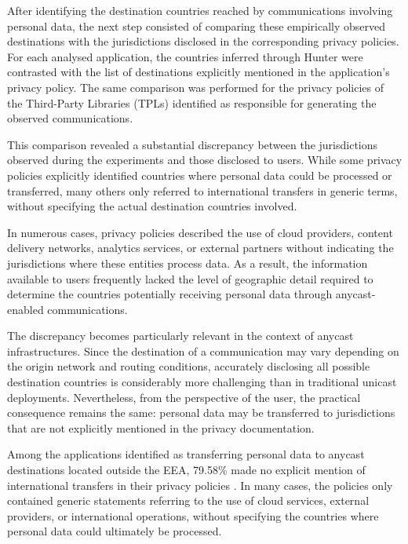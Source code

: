 After identifying the destination countries reached by communications involving personal data, the next step consisted of comparing these empirically observed destinations with the jurisdictions disclosed in the corresponding privacy policies. For each analysed application, the countries inferred through Hunter were contrasted with the list of destinations explicitly mentioned in the application's privacy policy. The same comparison was performed for the privacy policies of the Third-Party Libraries (TPLs) identified as responsible for generating the observed communications.

This comparison revealed a substantial discrepancy between the jurisdictions observed during the experiments and those disclosed to users. While some privacy policies explicitly identified countries where personal data could be processed or transferred, many others only referred to international transfers in generic terms, without specifying the actual destination countries involved.

In numerous cases, privacy policies described the use of cloud providers, content delivery networks, analytics services, or external partners without indicating the jurisdictions where these entities process data. As a result, the information available to users frequently lacked the level of geographic detail required to determine the countries potentially receiving personal data through anycast-enabled communications.

The discrepancy becomes particularly relevant in the context of anycast infrastructures. Since the destination of a communication may vary depending on the origin network and routing conditions, accurately disclosing all possible destination countries is considerably more challenging than in traditional unicast deployments. Nevertheless, from the perspective of the user, the practical consequence remains the same: personal data may be transferred to jurisdictions that are not explicitly mentioned in the privacy documentation.

Among the applications identified as transferring personal data to anycast destinations located outside the EEA, 79.58\% made no explicit mention of international transfers in their privacy policies \cite{Pascual2025AnycastDisaster}. In many cases, the policies only contained generic statements referring to the use of cloud services, external providers, or international operations, without specifying the countries where personal data could ultimately be processed.

